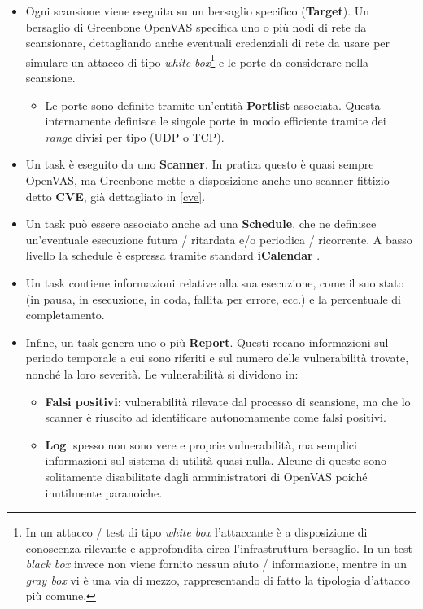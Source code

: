 \begin{itemize}
    \item Ogni scansione viene eseguita su un bersaglio specifico (\textbf{Target}). Un bersaglio di Greenbone OpenVAS specifica uno o più nodi di rete da scansionare, dettagliando anche eventuali credenziali di rete da usare per simulare un attacco di tipo \emph{white box}\footnote{In un attacco / test di tipo \emph{white box} l'attaccante è a disposizione di conoscenza rilevante e approfondita circa l'infrastruttura bersaglio. In un test \emph{black box} invece non viene fornito nessun aiuto / informazione, mentre in un \emph{gray box} vi è una via di mezzo, rappresentando di fatto la tipologia d'attacco più comune.} e le porte da considerare nella scansione.
    \begin{itemize}
        \item Le porte sono definite tramite un'entità \textbf{Portlist} associata. Questa internamente definisce le singole porte in modo efficiente tramite dei \emph{range} divisi per tipo (UDP o TCP).
    \end{itemize}
    \item Un task è eseguito da uno \textbf{Scanner}. In pratica questo è quasi sempre OpenVAS, ma Greenbone mette a disposizione anche uno scanner fittizio detto \textbf{CVE}, già dettagliato in \ref{cve}.
    \item Un task può essere associato anche ad una \textbf{Schedule}, che ne definisce un'eventuale esecuzione futura / ritardata e/o periodica / ricorrente. A basso livello la schedule è espressa tramite standard \textbf{iCalendar} \cite{rfc5545}.
    \item Un task contiene informazioni relative alla sua esecuzione, come il suo stato (in pausa, in esecuzione, in coda, fallita per errore, ecc.) e la percentuale di completamento.
    \item Infine, un task genera uno o più \textbf{Report}. Questi recano informazioni sul periodo temporale a cui sono riferiti e sul numero delle vulnerabilità trovate, nonché la loro severità. Le vulnerabilità si dividono in:
    \begin{itemize}
        \item \textbf{Falsi positivi}: vulnerabilità rilevate dal processo di scansione, ma che lo scanner è riuscito ad identificare autonomamente come falsi positivi.
        \item \textbf{Log}: spesso non sono vere e proprie vulnerabilità, ma semplici informazioni sul sistema di utilità quasi nulla. Alcune di queste sono solitamente disabilitate dagli amministratori di OpenVAS poiché inutilmente paranoiche.

\end{itemize}
\end{itemize}
